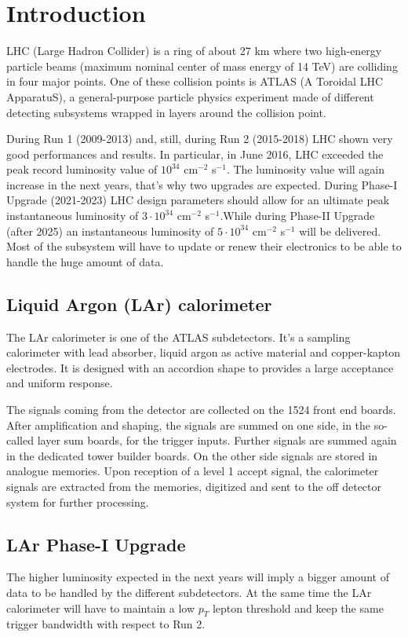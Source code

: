 \documentclass{llncs}
\begin{document}

\section{Introduction}
LHC (Large Hadron Collider) is a ring of about 27 km where two high-energy particle beams (maximum nominal center of mass energy of 14 TeV) are colliding in four major points. One of these collision points is ATLAS (A Toroidal LHC ApparatuS), a general-purpose particle physics experiment made of different detecting subsystems wrapped in layers around the collision point.

During Run 1 (2009-2013) and, still, during Run 2 (2015-2018) LHC shown very good performances and results. In particular, in June 2016, LHC exceeded the peak record luminosity value of $10^{34}$ cm$^{-2}$ s$^{-1}$. The luminosity value will again increase in the next years, that's why two upgrades are expected. During Phase-I Upgrade (2021-2023) LHC design parameters should allow for an ultimate peak instantaneous luminosity of $3 \cdot 10^{34}$ cm$^{-2}$ s$^{-1}$.While during Phase-II Upgrade (after 2025) an instantaneous luminosity of $5 \cdot 10^{34}$ cm$^{-2}$ s$^{-1}$ will be delivered. Most of the subsystem will have to update or renew their electronics to be able to handle the huge amount of data.

\subsection{Liquid Argon (LAr) calorimeter}
The LAr calorimeter is one of the ATLAS subdetectors. It's a sampling calorimeter with lead absorber, liquid argon as active material and copper-kapton electrodes. It is designed with an accordion shape to provides a large acceptance and uniform response.

The signals coming from the detector are collected on the 1524 front end boards. After amplification and shaping, the signals are summed on one side, in the so-called layer sum boards, for the trigger inputs. Further signals are summed again in the dedicated tower builder boards. On the other side signals are stored in analogue memories. Upon reception of a level 1 accept signal, the calorimeter signals are extracted from the memories, digitized and sent to the off detector system for further processing.
\cite{Wilken:1269029} \cite{Aleksa:1602230}

\subsection{LAr Phase-I Upgrade}
The higher luminosity expected in the next years will imply a bigger amount of data to be handled by the different subdetectors. At the same time the LAr calorimeter will have to maintain a low $p_{T}$ lepton threshold and keep the same trigger bandwidth with respect to Run 2.
\end{document}
